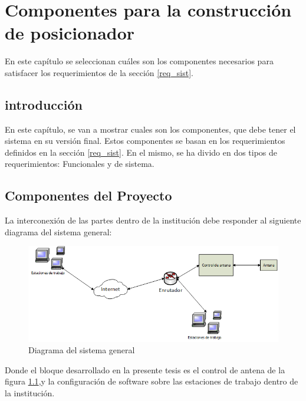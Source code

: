 \renewcommand{\chaptername}{Componentes para la construcción de posicionador}
\chapter{Componentes para la construcción de posicionador} 
\begin{center}
\begin{tcolorbox}[colback=gray!5!white, %
colframe=gray!75!black,
title= \center{\Large{resumen}} ]
En este capítulo se seleccionan cuáles son los componentes necesarios para satisfacer los requerimientos de la sección \ref{req_sist}.   
\end{tcolorbox}
\end{center}    
\section{introducción}

En este capítulo, se van a mostrar cuales son los componentes, que debe tener el sistema en su versión final. Estos componentes se basan en los requerimientos definidos en la sección \ref{req_sist}. En el mismo, se ha divido en dos tipos de requerimientos: Funcionales y de sistema. 

\section{Componentes del Proyecto}

La interconexión de las partes dentro de la institución debe responder al siguiente diagrama del sistema general: 
\begin{figure}[ht]	
	\centering
	\includegraphics[scale=0.8]{parte_1/cap2/ssgen}
	\caption{Diagrama del sistema general}
	\label{fig:fig_ssgen}
\end{figure}


Donde el bloque desarrollado en la presente tesis es el control de antena de la figura \ref{fig:fig_ssgen},y la configuración de software sobre las estaciones de trabajo dentro de la institución. 

